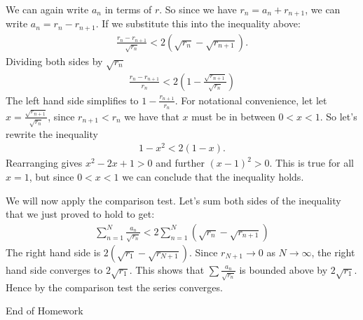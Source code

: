 \documentclass [10pt]{article}
\newcommand{\jg}[1]{{\color{blue} #1}}
\begin{document}
\begin{enumerate}
\begin{enumerate}
\jg{
We can again write $a_n$ in terms of $r$. So since we have $r_n = a_n + r_{n+1}$, we can write $a_n = r_n - r_{n+1}$. If we substitute this into the inequality above: 
\begin{align*}
    \frac{r_n - r_{n+1}}{\sqrt{r_n}} < 2 \left( \sqrt{r_n} - \sqrt{r_{n+1}} \right).
\end{align*}
Dividing both sides by $\sqrt{r_n}$
\begin{align*}
    \frac{r_n - r_{n+1}}{r_n} < 2 \left( 1- \frac{\sqrt{r_{n+1}}}{\sqrt{r_n}} \right)
\end{align*}
The left hand side simplifies to $1- \frac{r_{n+1}}{r_n}$. For notational convenience, let let $x = \frac{\sqrt{r_{n+1}}}{\sqrt{r_n}}$, since $r_{n+1} < r_n$ we have that $x$ must be in between $0 < x < 1$. So let's rewrite the inequality 
\begin{align*}
    1-x^2 < 2(1-x).
\end{align*}
Rearranging gives $x^2 - 2x+1 > 0$ and further $(x-1)^2 > 0$. This is true for all $x = 1$, but since $0 < x < 1$ we can conclude that the inequality holds. 

We will now apply the comparison test. Let's sum both sides of the inequality that we just proved to hold to get: 
\begin{align*}
    \sum_{n=1}^N \frac{a_n}{\sqrt{r_n}} < 2 \sum_{n=1}^N \left(\sqrt{r_n}-\sqrt{r_{n+1}}\right)
\end{align*}
The right hand side is $2(\sqrt{r_1} - \sqrt{r_{N+1}})$. Since $r_{N+1} \rightarrow 0$ as $N \rightarrow \infty$, the right hand side converges to $2 \sqrt{r_1}$. This shows that $\sum \frac{a_n}{\sqrt{r_n}}$ is bounded above by $2 \sqrt{r_1}$. Hence by the comparison test the series converges. 
}


\end{enumerate}
\end{enumerate}

\clearpage
\begin{center}
\vspace*{\fill}
{\Large End of Homework}
\vspace*{\fill}
\end{center}
\end{document}
